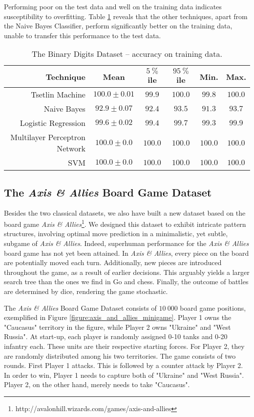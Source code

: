 \documentclass[11pt,a4paper]{article}
\begin{document}
Performing poor on the test data and well on the training data indicates susceptibility to overfitting. Table \ref{tab:accuracy_binary_digits_training} reveals that the other techniques, apart from the Naive Bayes Classifier, perform significantly better on the training data, unable to transfer this performance to the test data.

\begin{table}[!bh]
    \centering
    \begin{tabular}{r||c|c|c|c|c}
         \bf Technique&\bf Mean&\bf $5~\%$ile &\bf $95~\%$ile&\bf Min.&\bf Max.\\
         \hline
    Tsetlin Machine&$100.0 \pm 0.01$&$99.9$&$100.0$&$99.8$&$100.0$\\
    Naive Bayes&$92.9 \pm 0.07$&$92.4$&$93.5$&$91.3$&$93.7$\\
    Logistic Regression&$99.6 \pm 0.02$&$99.4$&$99.7$&$99.3$&$99.9$\\
    Multilayer Perceptron Network&$100.0 \pm 0.0$&$100.0$&$100.0$&$100.0$&$100.0$\\
    SVM&$100.0 \pm 0.0$&$100.0$&$100.0$&$100.0$&$100.0$
    \end{tabular}
    \caption{The Binary Digits Dataset -- accuracy on training data.}
    \label{tab:accuracy_binary_digits_training}
\end{table}

\subsection{The \emph{Axis \& Allies} Board Game Dataset}

Besides the two classical datasets, we also have built a new dataset based on the board game \emph{Axis \& Allies}\footnote{http://avalonhill.wizards.com/games/axis-and-allies}. 
We designed this dataset to exhibit intricate pattern structures, involving optimal move prediction in a minimalistic, yet subtle, subgame of \emph{Axis \& Allies}. Indeed, superhuman performance for the \emph{Axis \& Allies} board game has not yet been attained. In \emph{Axis \& Allies}, every piece on the board are potentially moved each turn. Additionally, new pieces are introduced throughout the game, as a result of earlier decisions. This arguably yields a larger search tree than the ones we find in Go and chess. Finally, the outcome of battles are determined by dice, rendering the game stochastic.

The \emph{Axis \& Allies} Board Game Dataset consists of $10~000$ board game positions, exemplified in Figure \ref{figure:axis_and_allies_minigame}. Player 1 owns the "Caucasus" territory in the figure, while Player 2 owns "Ukraine" and "West Russia". At start-up, each player is randomly assigned 0-10 tanks and 0-20 infantry each. These units are their respective starting forces. For Player 2, they are randomly distributed among his two territories. The game consists of two rounds. First Player 1 attacks. This is followed by a counter attack by Player 2. In order to win, Player 1 needs to capture both of "Ukraine" and "West Russia". Player 2, on the other hand, merely needs to take "Caucasus".
\end{document}
